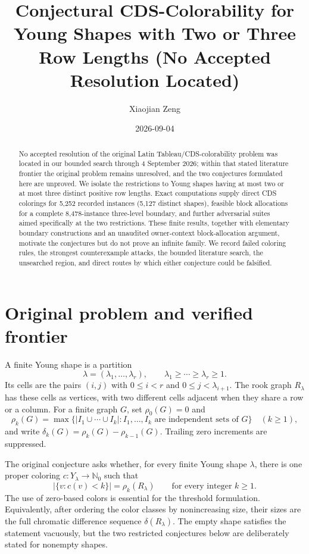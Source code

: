 \documentclass[11pt]{amsart}
\title[Conjectural CDS-Colorability]{Conjectural CDS-Colorability for Young Shapes with Two or Three Row Lengths (No Accepted Resolution Located)}
\author{Xiaojian Zeng}
\date{2026-09-04}
\theoremstyle{definition}
\begin{document}
\begin{abstract}
No accepted resolution of the original Latin Tableau/CDS-colorability problem
was located in our bounded search through 4 September 2026; within that stated
literature frontier the original problem remains unresolved, and the two
conjectures formulated here are unproved.  We isolate the restrictions
to Young shapes having at most two or at most three distinct positive row
lengths.  Exact computations supply direct CDS colorings for 5,252 recorded
instances (5,127 distinct shapes), feasible block allocations for a complete
8,478-instance three-level boundary, and further adversarial suites aimed
specifically at the two restrictions.  These finite results, together with
elementary boundary constructions and an unaudited owner-context
block-allocation argument, motivate the conjectures but do not prove an
infinite family.  We record failed coloring rules, the strongest
counterexample attacks, the bounded literature search, the unsearched region,
and direct routes by which either conjecture could be falsified.
\end{abstract}

\maketitle

\section{Original problem and verified frontier}

A finite Young shape is a partition
\[
  \lambda=(\lambda_1,\ldots,\lambda_r),
  \qquad \lambda_1\geq\cdots\geq\lambda_r\geq 1.
\]
Its cells are the pairs $(i,j)$ with $0\leq i<r$ and
$0\leq j<\lambda_{i+1}$.  The rook graph $R_\lambda$ has these cells as
vertices, with two different cells adjacent when they share a row or a
column.  For a finite graph $G$, set $\rho_0(G)=0$ and
\[
 \rho_k(G)=\max\bigl\{|I_1\cup\cdots\cup I_k|:
 I_1,\ldots,I_k\text{ are independent sets of }G\bigr\}
 \quad(k\geq1),
\]
and write $\delta_k(G)=\rho_k(G)-\rho_{k-1}(G)$.  Trailing zero
increments are suppressed.

The original conjecture asks whether, for every finite Young shape
$\lambda$, there is one proper coloring
$c:Y_\lambda\to\mathbb N_0$ such that
\begin{equation}
 \bigl|\{v:c(v)<k\}\bigr|=\rho_k(R_\lambda)
 \qquad\text{for every integer }k\geq1.
 \label{eq:ltc-cds}
\end{equation}
The use of zero-based colors is essential for the threshold formulation.
Equivalently, after ordering the color classes by nonincreasing size, their
sizes are the full chromatic difference sequence
$\delta(R_\lambda)$.  The empty shape satisfies the statement
vacuously, but the two restricted conjectures below are deliberately stated
for nonempty shapes.
\end{document}
